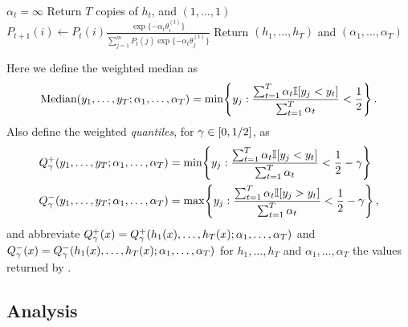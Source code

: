 \begin{algorithm}
\begin{algorithmic}
    \If $\alpha_{t} = \infty$ %
      \State Return $T$ copies of $h_{t}$, and $(1,\ldots,1)$
    \EndIf
      \State $P_{t+1}(i) \gets P_{t}(i) \frac{\exp\{-\alpha_{t}\theta_{i}^{(t)}\}}{\sum_{j=1}^{m} P_{t}(j) \exp\{-\alpha_{t}\theta_{j}^{(t)}\}}$
    \EndFor
\EndFor
\State Return $(h_{1},\ldots,h_{T})$ and $(\alpha_{1},\ldots,\alpha_{T})$ %
\end{algorithmic}
\end{algorithm}

\begin{sloppypar}
Here we define the weighted median as 
\begin{equation*}
\text{Median}(y_{1},\ldots,y_{T};\alpha_{1},\ldots,\alpha_{T}) = \min\!\left\{ y_{j} : \frac{\sum_{t=1}^{T} \alpha_{t} \mathbb{I}[ y_{j} < y_{t} ] }{\sum_{t=1}^{T} \alpha_{t}} < \frac{1}{2} \right\}.
\end{equation*}
Also define the weighted \emph{quantiles}, for $\gamma \in [0,1/2]$, as 
\begin{align*}
Q_{\gamma}^{+}(y_{1},\ldots,y_{T};\alpha_{1},\ldots,\alpha_{T}) & = \min\!\left\{ y_{j} : \frac{\sum_{t=1}^{T} \alpha_{t} \mathbb{I}[ y_{j} < y_{t} ] }{\sum_{t=1}^{T} \alpha_{t}} < \frac{1}{2} - \gamma \right\}
\\ Q_{\gamma}^{-}(y_{1},\ldots,y_{T};\alpha_{1},\ldots,\alpha_{T}) & = \max\!\left\{ y_{j} : \frac{\sum_{t=1}^{T} \alpha_{t} \mathbb{I}[ y_{j} > y_{t} ] }{\sum_{t=1}^{T} \alpha_{t}} < \frac{1}{2} - \gamma \right\},
\end{align*}
and abbreviate $Q_{\gamma}^{+}(x) = Q_{\gamma}^{+}(h_{1}(x),\ldots,h_{T}(x);\alpha_{1},\ldots,\alpha_{T})$ and $Q_{\gamma}^{-}(x) = Q_{\gamma}^{-}(h_{1}(x),\ldots,h_{T}(x);\alpha_{1},\ldots,\alpha_{T})$ 
for $h_{1},\ldots,h_{T}$ and $\alpha_{1},\ldots,\alpha_{T}$ the values returned by .
\end{sloppypar}


    


\subsection{Analysis}

